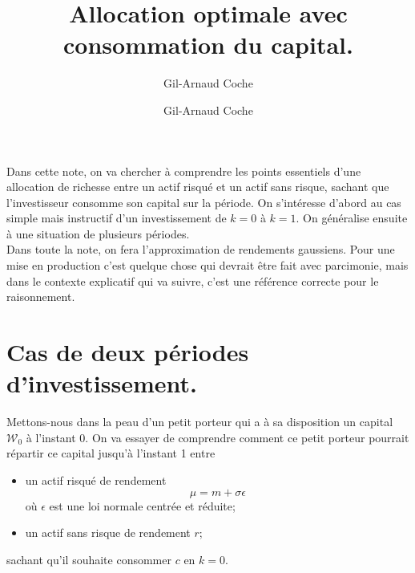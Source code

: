 \documentclass{article}
\author{Gil-Arnaud Coche}
\numberwithin{equation}{section}
\begin{document}
\newtheorem{hyp}{Hypothese}
\newtheorem*{hyp*}{Hypothese}

{}
{}
{\pgfpoint{\size}{\size}}
{
  \pgfsetlinewidth{\thickness}
  \pgfpathcircle{}
}
\newdimen\thickness
{}

\newcommand{\W}{\mathcal{W}}
\newcommand{\Lin}{\mathcal{L}}
\newcommand{\G}{\mathcal{G}}
\newcommand{\N}{\mathcal{N}}
\newcommand{\diff}{\textnormal{d}}

\title{\textbf{\color{awesomePurple}Allocation optimale avec consommation du capital.}}

\author{Gil-Arnaud Coche}
\maketitle

Dans cette note, on va chercher à comprendre les points essentiels d'une allocation de richesse entre un actif risqué et un actif sans risque, sachant que l'investisseur consomme son capital sur la période. On s'intéresse d'abord au cas simple mais instructif d'un investissement de $k = 0$ à $k = 1$. On généralise ensuite à une situation de plusieurs périodes.\\

Dans toute la note, on fera l'approximation de rendements gaussiens. Pour une mise en production c'est quelque chose qui devrait être fait avec parcimonie, mais dans le contexte explicatif qui va suivre, c'est une référence correcte pour le raisonnement.

\section{Cas de deux périodes d'investissement.}\label{sec:deux-periodes}

Mettons-nous dans la peau d'un petit porteur qui a à sa disposition un capital $\W_0$ à l'instant 0. On va essayer de comprendre comment ce petit porteur pourrait répartir ce capital jusqu'à l'instant 1 entre 
\begin{itemize}
\item un actif risqué de rendement 
$$
\mu = m + \sigma\epsilon
$$
où $\epsilon$ est une loi normale centrée et réduite;
\item un actif sans risque de rendement $r$;
\end{itemize}
sachant qu'il souhaite consommer $c$ en $k = 0$.
\end{document}
